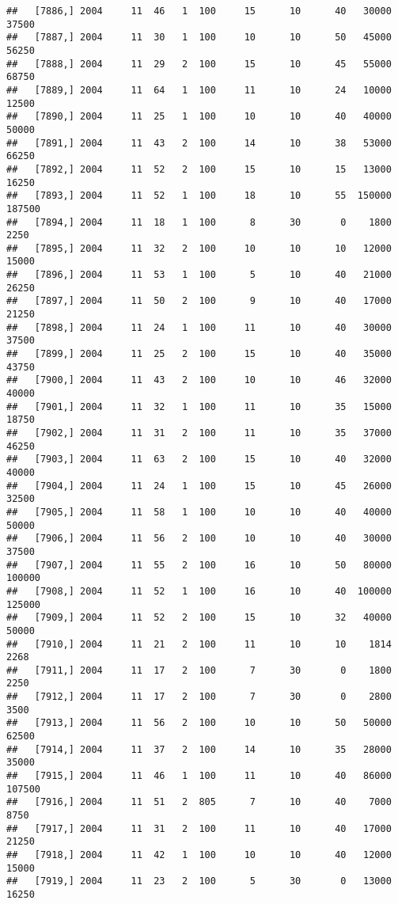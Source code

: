 \documentclass{article}\usepackage[]{graphicx}\usepackage[]{color}
\makeatletter
\newenvironment{kframe}{%
 \def\at@end@of@kframe{}%
 \ifinner\ifhmode%
  \def\at@end@of@kframe{\end{minipage}}%
  \begin{minipage}{\columnwidth}%
 \fi\fi%
 \def\FrameCommand##1{\hskip\@totalleftmargin \hskip-\fboxsep
 \colorbox{shadecolor}{##1}\hskip-\fboxsep
     \hskip-\linewidth \hskip-\@totalleftmargin \hskip\columnwidth}%
 \MakeFramed {\advance\hsize-\width
   \@totalleftmargin\z@ \linewidth\hsize
   \@setminipage}}%
 {\par\unskip\endMakeFramed%
 \at@end@of@kframe}
\newenvironment{knitrout}{}{} %
\makeatother
\begin{document}
\begin{knitrout}
\begin{kframe}
\begin{verbatim}
##   [7886,] 2004     11  46   1  100     15      10      40   30000   37500
##   [7887,] 2004     11  30   1  100     10      10      50   45000   56250
##   [7888,] 2004     11  29   2  100     15      10      45   55000   68750
##   [7889,] 2004     11  64   1  100     11      10      24   10000   12500
##   [7890,] 2004     11  25   1  100     10      10      40   40000   50000
##   [7891,] 2004     11  43   2  100     14      10      38   53000   66250
##   [7892,] 2004     11  52   2  100     15      10      15   13000   16250
##   [7893,] 2004     11  52   1  100     18      10      55  150000  187500
##   [7894,] 2004     11  18   1  100      8      30       0    1800    2250
##   [7895,] 2004     11  32   2  100     10      10      10   12000   15000
##   [7896,] 2004     11  53   1  100      5      10      40   21000   26250
##   [7897,] 2004     11  50   2  100      9      10      40   17000   21250
##   [7898,] 2004     11  24   1  100     11      10      40   30000   37500
##   [7899,] 2004     11  25   2  100     15      10      40   35000   43750
##   [7900,] 2004     11  43   2  100     10      10      46   32000   40000
##   [7901,] 2004     11  32   1  100     11      10      35   15000   18750
##   [7902,] 2004     11  31   2  100     11      10      35   37000   46250
##   [7903,] 2004     11  63   2  100     15      10      40   32000   40000
##   [7904,] 2004     11  24   1  100     15      10      45   26000   32500
##   [7905,] 2004     11  58   1  100     10      10      40   40000   50000
##   [7906,] 2004     11  56   2  100     10      10      40   30000   37500
##   [7907,] 2004     11  55   2  100     16      10      50   80000  100000
##   [7908,] 2004     11  52   1  100     16      10      40  100000  125000
##   [7909,] 2004     11  52   2  100     15      10      32   40000   50000
##   [7910,] 2004     11  21   2  100     11      10      10    1814    2268
##   [7911,] 2004     11  17   2  100      7      30       0    1800    2250
##   [7912,] 2004     11  17   2  100      7      30       0    2800    3500
##   [7913,] 2004     11  56   2  100     10      10      50   50000   62500
##   [7914,] 2004     11  37   2  100     14      10      35   28000   35000
##   [7915,] 2004     11  46   1  100     11      10      40   86000  107500
##   [7916,] 2004     11  51   2  805      7      10      40    7000    8750
##   [7917,] 2004     11  31   2  100     11      10      40   17000   21250
##   [7918,] 2004     11  42   1  100     10      10      40   12000   15000
##   [7919,] 2004     11  23   2  100      5      30       0   13000   16250

\end{verbatim}
\end{kframe}
\end{knitrout}
\end{document}
